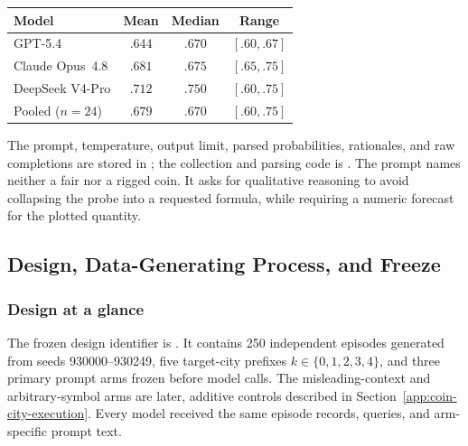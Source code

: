 \begin{center}
\begin{minipage}{0.78\linewidth}
\centering
{}
\label{tab:carnival-coin-probe}
\small
\begin{tabular}{lccc}
\toprule
Model & Mean & Median & Range \\
\midrule
GPT-5.4 & $.644$ & $.670$ & $[.60,.67]$ \\
Claude Opus~4.8 & $.681$ & $.675$ & $[.65,.75]$ \\
DeepSeek V4-Pro & $.712$ & $.750$ & $[.60,.75]$ \\
\midrule
Pooled ($n=24$) & $.679$ & $.670$ & $[.60,.75]$ \\
\bottomrule
\end{tabular}
\end{minipage}
\end{center}

The prompt, temperature, output limit, parsed probabilities, rationales, and raw
completions are stored in
;
the collection and parsing code is
. The prompt names
neither a fair nor a rigged coin. It asks for qualitative reasoning to avoid
collapsing the probe into a requested formula, while requiring a numeric forecast
for the plotted quantity.

\subsection{Design, Data-Generating Process, and Freeze}
\label{app:coin-city-design}

\subsubsection{Design at a glance}
The frozen design identifier is
. It contains 250 independent
episodes generated from seeds 930000--930249, five target-city prefixes
\(k\in\{0,1,2,3,4\}\), and three primary prompt arms frozen before model calls. The
misleading-context and arbitrary-symbol arms are later, additive controls described in
Section~\ref{app:coin-city-execution}. Every model received the same episode
records, queries, and arm-specific prompt text.

